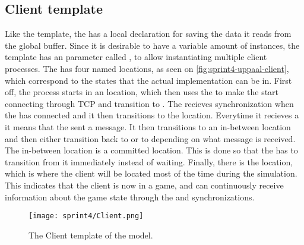 \subsection{Client template}
Like the  template, the  has a local declaration for saving the data it reads from the global buffer.
Since it is desirable to have a variable amount of instances, the template has an  parameter called , to allow instantiating multiple client processes.
The  has four named locations, as seen on \autoref{fig:sprint4-uppaal-client}, which correspond to the states that the actual implementation can be in.
First off, the process starts in an  location, which then uses the  to make the  start connecting through TCP and transition to .
The  recieves  synchronization when the  has connected and it then transitions to the  location.
Everytime it recieves a  it means that the  sent a message.
It then transitions to an in-between location and then either transition back to  or to  depending on what message is received.
The in-between location is a committed location.
This is done so that the  has to transition from it immediately instead of waiting.
Finally, there is the  location, which is where the client will be located most of the time during the simulation. 
This indicates that the client is now in a game, and can continuously receive information about the game state through the  and  synchronizations.
\begin{figure}[h]
    \centering
    \texttt{[image: sprint4/Client.png]}
    \caption{The Client template of the \uppaal model.}
    \label{fig:sprint4-uppaal-client}
\end{figure}

